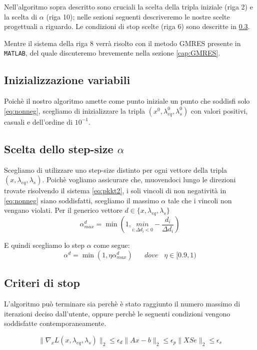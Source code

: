 Nell'algoritmo sopra descritto sono cruciali la scelta della tripla iniziale (riga 2) e la scelta di $\alpha$ (riga 10); nelle sezioni seguenti descriveremo le nostre scelte progettuali a riguardo.
Le condizioni di stop scelte (riga 6) sono descritte in \ref{cap:stop}.

Mentre il sistema della riga 8 verrà risolto con il metodo GMRES presente in \texttt{MATLAB}, del quale discuteremo brevemente nella sezione \ref{cap:GMRES}.

\subsection{Inizializzazione variabili}
Poichè il nostro algoritmo amette come punto iniziale un punto che soddisfi solo \ref{eq:nonneg}, scegliamo di inizializzare la tripla $(x^0, \lambda_{eq}^0, \lambda_s^0)$ con valori positivi, casuali e dell'ordine di $10^{-1}$. 

\subsection{Scelta dello step-size $\alpha$}
Scegliamo di utilizzare uno step-size distinto per ogni vettore della tripla $(x, \lambda_{eq}, \lambda_s)$.
Poichè vogliamo assicurare che, muovendoci lungo le direzioni trovate risolvendo il sistema \ref{eq:pkkt2}, i soli vincoli di non negatività in \ref{eq:nonneg} siano soddisfatti, scegliamo il massimo $\alpha$ tale che i vincoli non vengano violati.
Per il generico vettore $d \in \{x,\lambda_{eq},\lambda_s\} $ 
\begin{equation}\label{eq:alpha}
    \alpha^d_{max} = \min (1, \underset{i:\Delta d_i < 0}{min}-\frac{d_i}{\Delta d_i})
\end{equation}

E quindi scegliamo lo step $\alpha$ come segue:
\begin{equation}\label{eq:alphaFinale}
\alpha^d = \min(1, \eta \alpha^d_{max}) \;\;\;\;\;\; dove\;\;\; \eta \in [0.9, 1)
\end{equation}


\subsection{Criteri di stop}\label{cap:stop}
L'algoritmo può terminare sia perchè è stato raggiunto il numero massimo di iterazioni deciso dall'utente, oppure perchè le seguenti condizioni vengono soddisfatte contemporaneamente.

\begin{subequations}
\begin{equation}
\|\nabla _x L(x, \lambda_{eq}, \lambda_s)\|_2 \leq \epsilon_{d}
\end{equation}
\begin{equation}
   \| Ax - b\|_2 \leq \epsilon_{p}
\end{equation}
\begin{equation}
    \|XSe\|_2 \leq \epsilon_{s}
\end{equation}
\end{subequations}

